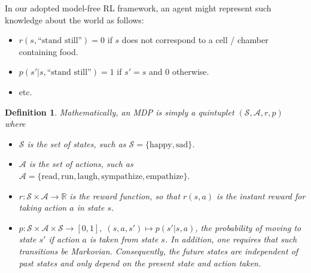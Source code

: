 \documentclass[10pt,letterpaper]{article}
\newtheorem*{definition*}{Definition}
\begin{document}
In our adopted model-free RL framework,
an agent might represent such knowledge about the world as follows:
\begin{itemize}
\item $r(s, \text{``stand still''}) = 0$ if $s$ does not correspond to a cell / chamber containing food.
\item $p(s'|s,\text{``stand still''}) = 1$ if $s'=s$ and $0$ otherwise.
\item etc.
\end{itemize}

\begin{definition*}
Mathematically, an MDP is simply a quintuplet $(\mathcal S, \mathcal A, r, p)$ where
\begin{itemize}
\item $\mathcal S$ is the set of states, such as $\mathcal S = \{\text{happy}, \text{sad}\}$.
\item $\mathcal A$ is the set of actions, such as $\mathcal A = \{\text{read}, \text{run},
  \text{laugh}, \text{sympathize}, \text{empathize}\}.$
\item $r : \mathcal S \times \mathcal A \rightarrow \mathbb R$ is the \textit{reward function},
   so that $r(s, a)$ is the instant reward for taking action $a$ in state $s$.
\item $p : \mathcal S \times \mathcal A \times \mathcal S \rightarrow [0, 1],\; (s,a,s') \mapsto p(s'|s,a)$,
  the probability of moving to state $s'$ if action $a$ is taken from state $s$. In addition, one requires that such
  transitions be Markovian. Consequently, the future states are independent of past states and only depend on the present state and action taken.

\end{itemize}

\end{definition*}
\end{document}
